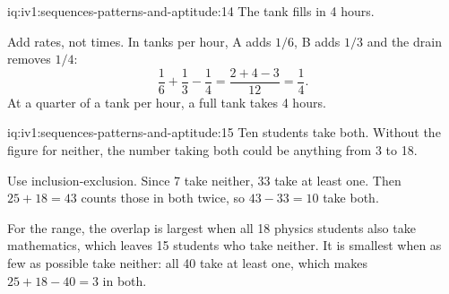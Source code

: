 \begin{solution}{iq:iv1:sequences-patterns-and-aptitude:14}
The tank fills in 4 hours.

Add rates, not times. In tanks per hour, A adds $1/6$, B adds $1/3$ and the drain removes $1/4$:
\[
\frac16 + \frac13 - \frac14 = \frac{2 + 4 - 3}{12} = \frac14.
\]
At a quarter of a tank per hour, a full tank takes 4 hours.

\end{solution}

\begin{solution}{iq:iv1:sequences-patterns-and-aptitude:15}
Ten students take both. Without the figure for neither, the number taking both could be anything from 3 to 18.

Use inclusion-exclusion. Since 7 take neither, 33 take at least one. Then $25 + 18 = 43$ counts those in both twice, so $43 - 33 = 10$ take both.

For the range, the overlap is largest when all 18 physics students also take mathematics, which leaves 15 students who take neither. It is smallest when as few as possible take neither: all 40 take at least one, which makes $25 + 18 - 40 = 3$ in both.

\end{solution}

